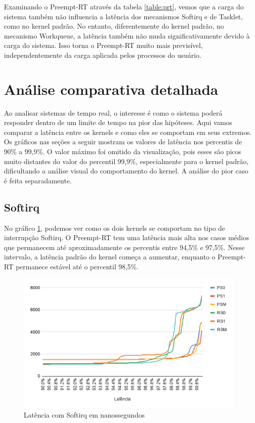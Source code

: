 Examinando o Preempt-RT através da tabela \ref{table:prt}, vemos que a carga do sistema também não influencia a latência dos mecanismos Softirq e de Tasklet, como no kernel padrão. No entanto, diferentemente do kernel padrão, no mecanismo Workqueue, a latência também não muda significativamente devido à carga do sistema. Isso torna o Preempt-RT muito mais previsível, independentemente da carga aplicada pelos processos do usuário.

\section{Análise comparativa detalhada}

Ao analisar sistemas de tempo real, o interesse é como o sistema poderá responder dentro de um limite de tempo na pior das hipóteses. Aqui vamos comparar a latência entre os kernels e como eles se comportam em seus extremos. Os gráficos nas seções a seguir mostram os valores de latência nos percentis de 90\% a 99,9\%. O valor máximo foi omitido da visualização, pois esses são picos muito distantes do valor do percentil 99,9\%, especialmente para o kernel padrão, dificultando a análise visual do comportamento do kernel. A análise do pior caso é feita separadamente.

\subsection{Softirq}

No gráfico \ref{grafico:softirq}, podemos ver como os dois kernels se comportam no tipo de interrupção Softirq. O Preempt-RT tem uma latência mais alta nos casos médios que permanecem até aproximadamente os percentis entre 94,5\% e 97,5\%. Nesse intervalo, a latência padrão do kernel começa a aumentar, enquanto o Preempt-RT permanece estável até o percentil 98,5\%.

\begin{figure}[!htb]
    \centering
    \includegraphics[width=\textwidth]{graficos/softirq.png}
    \caption{Latência com Softirq em nanossegundos}
    \label{grafico:softirq}
\end{figure}

